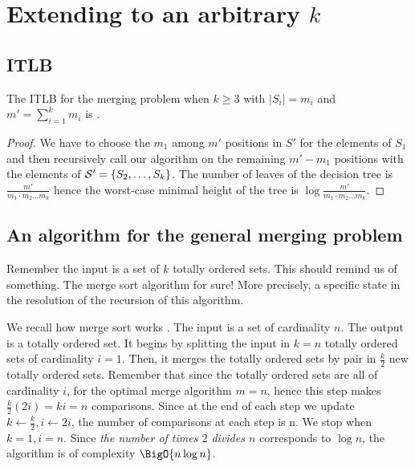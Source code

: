 \section{Extending to an arbitrary $k$}
\label{tree:merging:kgeq3}


\subsection{ITLB}
\label{tree:merging:kgeq3:ITLB}


\begin{theorem}
The ITLB for the merging problem when $k \geq 3$ with $|S_i| = m_i$ and $m' = \sum_{i=1}^{k} m_i$ is .
\end{theorem}

\begin{proof}
We have to choose the $m_1$ among $m'$ positions in $S'$ for the elements of $S_1$ and then recursively call our algorithm on the remaining $m' - m_1$ positions with the elements of ${\cal S}' = \{S_2, \dots, S_k\}$. The number of leaves of the decision tree is $\frac{m'}{m_1 \cdot m_2 \dots m_k}$ hence the worst-case minimal height of the tree is $\log \frac{m'}{m_1 \cdot m_2 \dots m_k}$.
\end{proof}


\subsection{An algorithm for the general merging problem}
\label{tree:merging:kgeq3:alg}

Remember the input is a set of $k$ totally ordered sets. This should remind us of something. The merge sort algorithm for sure! More precisely, a specific state in the resolution of the recursion of this algorithm.

We recall how merge sort works \cite{leiserson2001introduction}. The input is a set of cardinality $n$. The output is a totally ordered set. It begins by splitting the input in $k = n$ totally ordered sets of cardinality $i = 1$. Then, it merges the totally ordered sets by pair in $\frac{k}{2}$ new totally ordered sets. Remember that since the totally ordered sets are all of cardinality $i$, for the optimal merge algorithm $m=n$, hence this step makes $\frac{k}{2} (2 i) = k i = n$ comparisons. Since at the end of each step we update $k \gets \frac{k}{2}, i \gets 2i$, the number of comparisons at each step is n. We stop when $k = 1, i = n$.
Since \emph{the number of times $2$ divides $n$} corresponds to $\log n$, the algorithm is of complexity $\BigO{n \log n}$.

